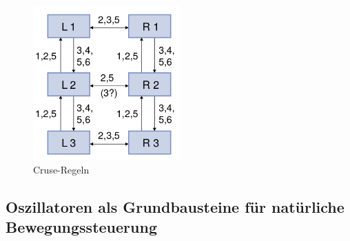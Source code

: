\begin{figure}[h!]
	\centering
	\includegraphics[width=0.5\textwidth]{figures/ch05_Cruse.png}
	\caption{Cruse-Regeln}
	\label{Cruse}
\end{figure}
\subsection{Oszillatoren als Grundbausteine für natürliche Bewegungssteuerung}
